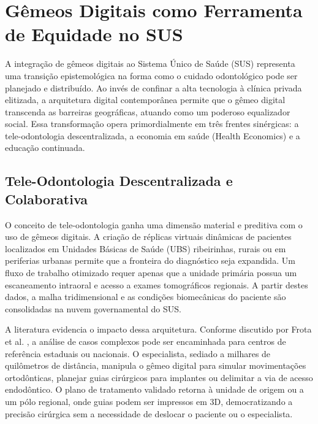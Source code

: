 \section{Gêmeos Digitais como Ferramenta de Equidade no SUS}

A integração de gêmeos digitais ao Sistema Único de Saúde (SUS) representa uma transição epistemológica na forma como o cuidado odontológico pode ser planejado e distribuído. Ao invés de confinar a alta tecnologia à clínica privada elitizada, a arquitetura digital contemporânea permite que o gêmeo digital transcenda as barreiras geográficas, atuando como um poderoso equalizador social. Essa transformação opera primordialmente em três frentes sinérgicas: a tele-odontologia descentralizada, a economia em saúde (Health Economics) e a educação continuada.

\subsection{Tele-Odontologia Descentralizada e Colaborativa}

O conceito de tele-odontologia ganha uma dimensão material e preditiva com o uso de gêmeos digitais. A criação de réplicas virtuais dinâmicas de pacientes localizados em Unidades Básicas de Saúde (UBS) ribeirinhas, rurais ou em periferias urbanas permite que a fronteira do diagnóstico seja expandida. Um fluxo de trabalho otimizado requer apenas que a unidade primária possua um escaneamento intraoral e acesso a exames tomográficos regionais. A partir destes dados, a malha tridimensional e as condições biomecânicas do paciente são consolidadas na nuvem governamental do SUS.

A literatura evidencia o impacto dessa arquitetura. Conforme discutido por Frota et al. \cite{frota2025sus}, a análise de casos complexos pode ser encaminhada para centros de referência estaduais ou nacionais. O especialista, sediado a milhares de quilômetros de distância, manipula o gêmeo digital para simular movimentações ortodônticas, planejar guias cirúrgicos para implantes ou delimitar a via de acesso endodôntico. O plano de tratamento validado retorna à unidade de origem ou a um pólo regional, onde guias podem ser impressos em 3D, democratizando a precisão cirúrgica sem a necessidade de deslocar o paciente ou o especialista.

